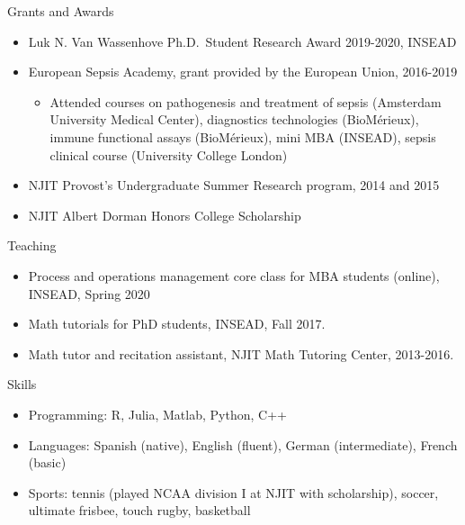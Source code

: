 \documentclass{resume}
\begin{document}
\begin{rSection}{Grants and Awards}

\begin{itemize}
\item Luk N. Van Wassenhove Ph.D.\ Student Research Award 2019-2020, INSEAD
\item European Sepsis Academy, grant provided by the European Union, 2016-2019
\begin{itemize}
  \item Attended courses on pathogenesis and treatment of sepsis (Amsterdam University Medical Center), diagnostics technologies (BioM\'erieux), immune functional assays (BioM\'erieux), mini MBA (INSEAD), sepsis clinical course (University College London)
\end{itemize}
\item NJIT Provost’s Undergraduate Summer Research program, 2014 and 2015
\item NJIT Albert Dorman Honors College Scholarship
\end{itemize}

\begin{rSection}{Teaching}
\begin{itemize}
\item Process and operations management core class for MBA students (online), INSEAD, Spring 2020
\item Math tutorials for PhD students, INSEAD, Fall 2017.
\item Math tutor and recitation assistant, NJIT Math Tutoring Center, 2013-2016.
\end{itemize}

\end{rSection}


\end{rSection}

\begin{rSection}{Skills}
\begin{itemize}
\item Programming: R, Julia, Matlab, Python, C++
\item Languages: Spanish (native), English (fluent), German (intermediate), French (basic)
\item Sports: tennis (played NCAA division I at NJIT with scholarship), soccer, ultimate frisbee, touch rugby, basketball
\end{itemize}

\end{rSection}
 
\end{document}
